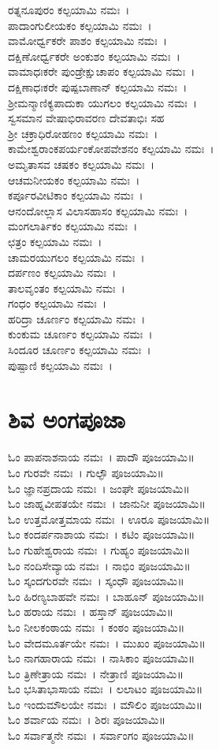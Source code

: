 ರತ್ನನೂಪುರಂ ಕಲ್ಪಯಾಮಿ ನಮಃ~।\\
ಪಾದಾಂಗುಲೀಯಕಂ ಕಲ್ಪಯಾಮಿ ನಮಃ~।\\
ವಾಮೋರ್ಧ್ವಕರೇ ಪಾಶಂ ಕಲ್ಪಯಾಮಿ ನಮಃ~।\\
ದಕ್ಷಿಣೋರ್ಧ್ವಕರೇ ಅಂಕುಶಂ ಕಲ್ಪಯಾಮಿ ನಮಃ~।\\
ವಾಮಾಧಃಕರೇ ಪುಂಡ್ರೇಕ್ಷುಚಾಪಂ ಕಲ್ಪಯಾಮಿ ನಮಃ~।\\
ದಕ್ಷಿಣಾಧಃಕರೇ ಪುಷ್ಪಬಾಣಾನ್ ಕಲ್ಪಯಾಮಿ ನಮಃ~।\\
ಶ್ರೀಮನ್ಮಾಣಿಕ್ಯಪಾದುಕಾ ಯುಗಲಂ ಕಲ್ಪಯಾಮಿ ನಮಃ~।\\
ಸ್ವಸಮಾನ ವೇಷಾಭಿರಾವರಣ ದೇವತಾಭಿಃ ಸಹ\\ ಶ್ರೀ ಚಕ್ರಾಧಿರೋಹಣಂ ಕಲ್ಪಯಾಮಿ ನಮಃ~।\\
ಕಾಮೇಶ್ವರಾಂಕಪರ್ಯಂಕೋಪವೇಶನಂ ಕಲ್ಪಯಾಮಿ ನಮಃ~।\\
ಅಮೃತಾಸವ ಚಷಕಂ ಕಲ್ಪಯಾಮಿ ನಮಃ~।\\
ಆಚಮನೀಯಕಂ ಕಲ್ಪಯಾಮಿ ನಮಃ~।\\
ಕರ್ಪೂರವೀಟಿಕಾಂ ಕಲ್ಪಯಾಮಿ ನಮಃ~।\\
ಆನಂದೋಲ್ಲಾಸ ವಿಲಾಸಹಾಸಂ ಕಲ್ಪಯಾಮಿ ನಮಃ~।\\
ಮಂಗಲಾರ್ತಿಕಂ ಕಲ್ಪಯಾಮಿ ನಮಃ~।\\
ಛತ್ರಂ ಕಲ್ಪಯಾಮಿ ನಮಃ~।\\
ಚಾಮರಯುಗಲಂ ಕಲ್ಪಯಾಮಿ ನಮಃ~।\\
ದರ್ಪಣಂ ಕಲ್ಪಯಾಮಿ ನಮಃ~।\\
ತಾಲವೃಂತಂ ಕಲ್ಪಯಾಮಿ ನಮಃ~।\\
ಗಂಧಂ ಕಲ್ಪಯಾಮಿ ನಮಃ~।\\
ಹರಿದ್ರಾ ಚೂರ್ಣಂ ಕಲ್ಪಯಾಮಿ ನಮಃ~।\\
ಕುಂಕುಮ ಚೂರ್ಣಂ ಕಲ್ಪಯಾಮಿ ನಮಃ~।\\
ಸಿಂದೂರ ಚೂರ್ಣಂ ಕಲ್ಪಯಾಮಿ ನಮಃ~।\\
ಪುಷ್ಪಾಣಿ ಕಲ್ಪಯಾಮಿ ನಮಃ~।
\section{ಶಿವ ಅಂಗಪೂಜಾ }
ಓಂ ಪಾಪನಾಶನಾಯ ನಮಃ~। ಪಾದೌ ಪೂಜಯಾಮಿ॥\\
ಓಂ ಗುರವೇ ನಮಃ~। ಗುಲ್ಫೌ ಪೂಜಯಾಮಿ॥\\
ಓಂ ಜ್ಞಾನಪ್ರದಾಯ ನಮಃ~। ಜಂಘೇ ಪೂಜಯಾಮಿ॥\\
ಓಂ ಜಾಹ್ನವೀಪತಯೇ ನಮಃ~। ಜಾನುನೀ ಪೂಜಯಾಮಿ॥\\
ಓಂ ಉತ್ತಮೋತ್ತಮಾಯ ನಮಃ~। ಊರೂ ಪೂಜಯಾಮಿ॥\\
ಓಂ ಕಂದರ್ಪನಾಶಾಯ ನಮಃ~। ಕಟಿಂ ಪೂಜಯಾಮಿ॥\\
ಓಂ ಗುಹೇಶ್ವರಾಯ ನಮಃ~। ಗುಹ್ಯಂ ಪೂಜಯಾಮಿ॥\\
ಓಂ ನಂದಿಸೇವ್ಯಾಯ ನಮಃ~। ನಾಭಿಂ ಪೂಜಯಾಮಿ॥\\
ಓಂ ಸ್ಕಂದಗುರವೇ ನಮಃ~। ಸ್ಕಂಧೌ ಪೂಜಯಾಮಿ॥\\
ಓಂ ಹಿರಣ್ಯಬಾಹವೇ ನಮಃ~। ಬಾಹೂನ್ ಪೂಜಯಾಮಿ॥\\
ಓಂ ಹರಾಯ ನಮಃ~। ಹಸ್ತಾನ್ ಪೂಜಯಾಮಿ॥\\
ಓಂ ನೀಲಕಂಠಾಯ ನಮಃ~। ಕಂಠಂ ಪೂಜಯಾಮಿ॥\\
ಓಂ ವೇದಮೂರ್ತಯೇ ನಮಃ~। ಮುಖಂ ಪೂಜಯಾಮಿ॥\\
ಓಂ ನಾಗಹಾರಾಯ ನಮಃ~। ನಾಸಿಕಾಂ ಪೂಜಯಾಮಿ॥\\
ಓಂ ತ್ರಿಣೇತ್ರಾಯ ನಮಃ~। ನೇತ್ರಾಣಿ ಪೂಜಯಾಮಿ॥\\
ಓಂ ಭಸಿತಾಭಾಸಾಯ ನಮಃ~। ಲಲಾಟಂ ಪೂಜಯಾಮಿ॥\\
ಓಂ ಇಂದುಮೌಲಯೇ ನಮಃ~। ಮೌಲಿಂ ಪೂಜಯಾಮಿ॥\\
ಓಂ ಶರ್ವಾಯ ನಮಃ~। ಶಿರಃ ಪೂಜಯಾಮಿ॥\\
ಓಂ ಸರ್ವಾತ್ಮನೇ ನಮಃ~। ಸರ್ವಾಂಗಂ ಪೂಜಯಾಮಿ॥

